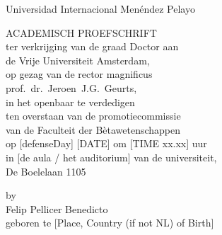\begin{titlepage}

\begin{center}

\vspace{30mm}

{\makeatletter
\titlestyle\bfseries\LARGE\@title
\makeatother}

{\makeatletter
\ifx\@subtitle\undefined\else
    \medskip
    \titlefont\titleshape\Large\@subtitle
\fi
\makeatother}

\end{center}





\cleardoublepage
\thispagestyle{empty}
\begin{center}

\Large{Universidad Internacional Menéndez Pelayo}\\
\vspace{18mm}

{\makeatletter
\titlestyle\bfseries\LARGE\@title
\makeatother}

{\makeatletter
\ifx\@subtitle\undefined\else
    \titlefont\titleshape\Large\@subtitle
\fi
\makeatother}

\vspace{25mm}

\Large{ACADEMISCH PROEFSCHRIFT}\\
\vspace{6mm}
\large ter verkrijging van de graad {D}octor aan\\
de {V}rije {U}niversiteit {A}msterdam,\\
op gezag van de rector magnificus\\
prof.~dr.~Jeroen~J.G.~Geurts,\\ 
in het openbaar te verdedigen\\       
ten overstaan van de promotiecommissie\\
van de Faculteit der B\`{e}tawetenschappen\\        
op [defenseDay] [DATE] om [TIME xx.xx] uur \\      
in [de aula / het auditorium] van de universiteit,\\
De Boelelaan 1105\\
\par\vspace {4cm}


\linespread{1.8}
\large by\\ {\LARGE Felip Pellicer Benedicto}\\
\large geboren te [Place, Country (if not NL) of Birth]

\end{center}



\end{titlepage}

